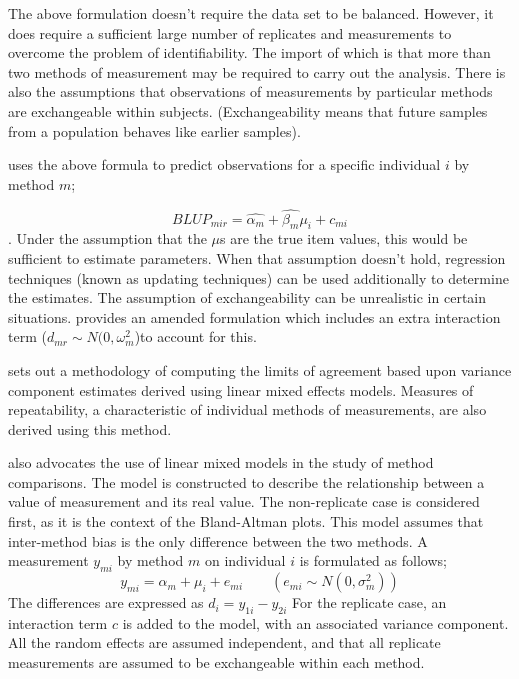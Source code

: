 \documentclass[12pt, a4paper]{report}
\theoremstyle{plain}
\theoremstyle{definition}
\theoremstyle{remark}
\begin{document}
The above formulation doesn't require the data set to be balanced.
However, it does require a sufficient large number of replicates
and measurements to overcome the problem of identifiability. The
import of which is that more than two methods of measurement may
be required to carry out the analysis. There is also the
assumptions that observations of measurements by particular
methods are exchangeable within subjects. (Exchangeability means
that future samples from a population behaves like earlier
samples).



\citet{BXC2004} uses the above formula to predict observations for
a specific individual $i$ by method $m$;

\begin{equation}BLUP_{mir} = \hat{\alpha_{m}} + \hat{\beta_{m}}\mu_{i} +
c_{mi} \end{equation}. Under the assumption that the $\mu$s are
the true item values, this would be sufficient to estimate
parameters. When that assumption doesn't hold, regression
techniques (known as updating techniques) can be used additionally
to determine the estimates. The assumption of exchangeability can
be unrealistic in certain situations. \citet{BXC2004} provides an
amended formulation which includes an extra interaction term ($
d_{mr} \sim N(0,\omega^{2}_{m}$)to account for this.



\citet{BXC2008} sets out a methodology of computing the limits of
agreement based upon variance component estimates derived using
linear mixed effects models. Measures of repeatability, a
characteristic of individual methods of measurements, are also
derived using this method.

\citet{BXC2004} also advocates the use of linear mixed models in
the study of method comparisons. The model is constructed to
describe the relationship between a value of measurement and its
real value. The non-replicate case is considered first, as it is
the context of the Bland-Altman plots. This model assumes that
inter-method bias is the only difference between the two methods.
A measurement $y_{mi}$ by method $m$ on individual $i$ is
formulated as follows;
\begin{equation}
y_{mi}  = \alpha_{m} + \mu_{i} + e_{mi} \qquad ( e_{mi} \sim
N(0,\sigma^{2}_{m}))
\end{equation}
The differences are expressed as $d_{i} = y_{1i} - y_{2i}$ For the
replicate case, an interaction term $c$ is added to the model,
with an associated variance component. All the random effects are
assumed independent, and that all replicate measurements are
assumed to be exchangeable within each method.
\end{document}
